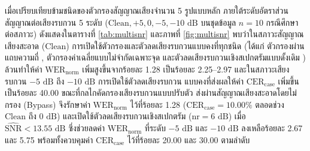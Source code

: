 \begin{table}[H]
\centering
\caption{ผลการค้นหาพารามิเตอร์ตัวลดเสียงรบกวนเชิงสเปกตรัม (\texttt{afftdn}) ที่ระดับเสียงรบกวนตู้ดูดควัน $\mathrm{SNR} = -10\text{ dB}$ ($n = 10$ กรณีต่อรูปแบบ)}
\label{tab:afftdn_grid}
\footnotesize\setlength{\tabcolsep}{4pt}
\end{table}

เมื่อเปรียบเทียบข้ามชนิดของตัวกรองสัญญาณเสียงจำนวน 5 รูปแบบหลัก ภายใต้ระดับอัตราส่วนสัญญาณต่อเสียงรบกวน 5 ระดับ ($\mathrm{Clean}, +5, 0, -5, -10\text{ dB}$ บนชุดข้อมูล $n=10$ กรณีศึกษาต่อสภาวะ) ดังแสดงในตารางที่ \ref{tab:multisnr} และภาพที่ \ref{fig:multisnr} พบว่าในสภาวะสัญญาณเสียงสะอาด ($\mathrm{Clean}$) การเปิดใช้ตัวกรองและตัวลดเสียงรบกวนแบบคงที่ทุกชนิด (ได้แก่ ตัวกรองผ่านแถบความถี่ , ตัวกรองค่าเฉลี่ยแบบไม่จำกัดเฉพาะจุด  และตัวลดเสียงรบกวนเชิงสเปกตรัมแบบดั้งเดิม ) ล้วนทำให้ค่า $\mathrm{WER}_{\mathrm{norm}}$ เพิ่มสูงขึ้นจากร้อยละ 1.28 เป็นร้อยละ 2.25--2.97 และในสภาวะเสียงรบกวน $-5\text{ dB}$ ถึง $-10\text{ dB}$ การเปิดใช้ตัวลดเสียงรบกวน  แบบคงที่ส่งผลให้ค่า $\mathrm{CER}_{\mathrm{case}}$ เพิ่มขึ้นเป็นร้อยละ 40.00 ขณะที่กลไกคัดกรองเสียงรบกวนแบบปรับตัว \textbf{} ส่งผ่านสัญญาณเสียงสะอาดโดยไม่กรอง (Bypass) จึงรักษาค่า $\mathrm{WER}_{\mathrm{norm}}$ ไว้ที่ร้อยละ 1.28 ($\mathrm{CER}_{\mathrm{case}} = 10.00\%$ ตลอดช่วง $\mathrm{Clean}$ ถึง $0\text{ dB}$) และเปิดใช้ตัวลดเสียงรบกวนเชิงสเปกตรัม  ($\mathrm{nr}=6\text{ dB}$) เมื่อ $\widehat{\mathrm{SNR}} < 13.55\text{ dB}$ ซึ่งช่วยลดค่า $\mathrm{WER}_{\mathrm{norm}}$ ที่ระดับ $-5\text{ dB}$ และ $-10\text{ dB}$ ลงเหลือร้อยละ 2.67 และ 5.75 พร้อมทั้งควบคุมค่า $\mathrm{CER}_{\mathrm{case}}$ ไว้ที่ร้อยละ 20.00 และ 30.00 ตามลำดับ

